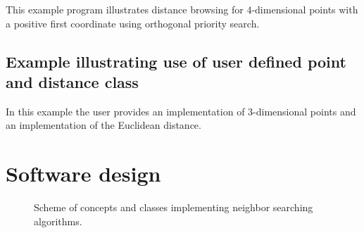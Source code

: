 This example program illustrates distance browsing for $4$-dimensional points with
a positive first coordinate using orthogonal priority search.

 


\subsection{Example illustrating use of user defined point and distance class}

In this example the user provides an implementation of 3-dimensional points and an
implementation of the Euclidean distance.


\section{Software design}

\begin{figure}[t]
\begin{ccTexOnly}
\begin{center}
\leavevmode
\vspace*{-6.5cm}
\hspace*{-2cm}
\end{center}
\vspace*{6cm}
\end{ccTexOnly}
\caption{Scheme of concepts and classes implementing neighbor searching algorithms.
\label{ASPAS:Fig1}}
\end{figure}

